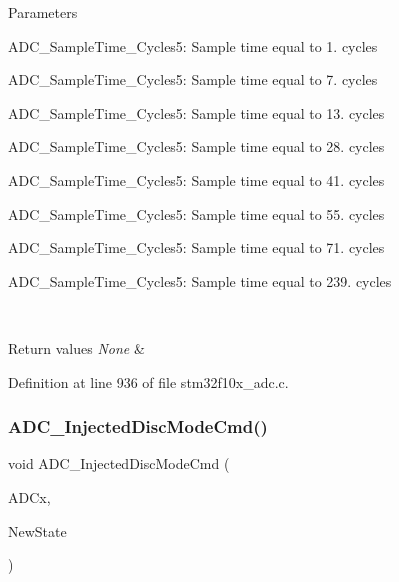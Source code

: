 \begin{DoxyParams}{Parameters}
\begin{DoxyItemize}
\item A\+D\+C\+\_\+\+Sample\+Time\+\_\+Cycles5\+: Sample time equal to 1. cycles \item A\+D\+C\+\_\+\+Sample\+Time\+\_\+Cycles5\+: Sample time equal to 7. cycles \item A\+D\+C\+\_\+\+Sample\+Time\+\_\+Cycles5\+: Sample time equal to 13. cycles \item A\+D\+C\+\_\+\+Sample\+Time\+\_\+Cycles5\+: Sample time equal to 28. cycles \item A\+D\+C\+\_\+\+Sample\+Time\+\_\+Cycles5\+: Sample time equal to 41. cycles \item A\+D\+C\+\_\+\+Sample\+Time\+\_\+Cycles5\+: Sample time equal to 55. cycles \item A\+D\+C\+\_\+\+Sample\+Time\+\_\+Cycles5\+: Sample time equal to 71. cycles \item A\+D\+C\+\_\+\+Sample\+Time\+\_\+Cycles5\+: Sample time equal to 239. cycles \end{DoxyItemize}
\\
\hline
\end{DoxyParams}

\begin{DoxyRetVals}{Return values}
{\em None} & \\
\hline
\end{DoxyRetVals}


Definition at line 936 of file stm32f10x\+\_\+adc.\+c.

\mbox{\label{group___a_d_c___private___functions_ga0b583b94183fa4ff287177b9ee808092}} 
\subsubsection{\texorpdfstring{A\+D\+C\+\_\+\+Injected\+Disc\+Mode\+Cmd()}{ADC\_InjectedDiscModeCmd()}}
{\footnotesize\ttfamily void A\+D\+C\+\_\+\+Injected\+Disc\+Mode\+Cmd (\begin{DoxyParamCaption}\item[{\hyperlink{struct_a_d_c___type_def}{A\+D\+C\+\_\+\+Type\+Def} $\ast$}]{A\+D\+Cx,  }\item[{\hyperlink{group___exported__types_gac9a7e9a35d2513ec15c3b537aaa4fba1}{Functional\+State}}]{New\+State }\end{DoxyParamCaption})}



